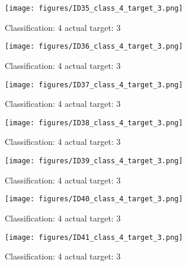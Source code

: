\begin{figure}[h!]
\begin{center}
\texttt{[image: figures/ID35\_class\_4\_target\_3.png]}
\end{center}
\caption{ Classification: 4 actual target: 3}
\label{fig:ID35_class_4_target_3}
\end{figure}
\begin{figure}[h!]
\begin{center}
\texttt{[image: figures/ID36\_class\_4\_target\_3.png]}
\end{center}
\caption{ Classification: 4 actual target: 3}
\label{fig:ID36_class_4_target_3}
\end{figure}
\begin{figure}[h!]
\begin{center}
\texttt{[image: figures/ID37\_class\_4\_target\_3.png]}
\end{center}
\caption{ Classification: 4 actual target: 3}
\label{fig:ID37_class_4_target_3}
\end{figure}
\begin{figure}[h!]
\begin{center}
\texttt{[image: figures/ID38\_class\_4\_target\_3.png]}
\end{center}
\caption{ Classification: 4 actual target: 3}
\label{fig:ID38_class_4_target_3}
\end{figure}
\begin{figure}[h!]
\begin{center}
\texttt{[image: figures/ID39\_class\_4\_target\_3.png]}
\end{center}
\caption{ Classification: 4 actual target: 3}
\label{fig:ID39_class_4_target_3}
\end{figure}
\begin{figure}[h!]
\begin{center}
\texttt{[image: figures/ID40\_class\_4\_target\_3.png]}
\end{center}
\caption{ Classification: 4 actual target: 3}
\label{fig:ID40_class_4_target_3}
\end{figure}
\begin{figure}[h!]
\begin{center}
\texttt{[image: figures/ID41\_class\_4\_target\_3.png]}
\end{center}
\caption{ Classification: 4 actual target: 3}
\label{fig:ID41_class_4_target_3}
\end{figure}
